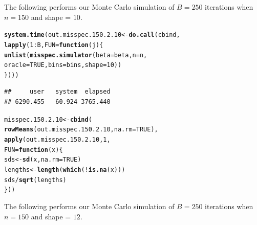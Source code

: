 \documentclass[11pt]{article}\usepackage[]{graphicx}\usepackage[]{color}
\makeatletter
\newcommand{\hlnum}[1]{\textcolor[rgb]{0.686,0.059,0.569}{#1}}%
\newcommand{\hlopt}[1]{\textcolor[rgb]{0,0,0}{#1}}%
\newcommand{\hlstd}[1]{\textcolor[rgb]{0.345,0.345,0.345}{#1}}%
\newcommand{\hlkwa}[1]{\textcolor[rgb]{0.161,0.373,0.58}{\textbf{#1}}}%
\newcommand{\hlkwb}[1]{\textcolor[rgb]{0.69,0.353,0.396}{#1}}%
\newcommand{\hlkwc}[1]{\textcolor[rgb]{0.333,0.667,0.333}{#1}}%
\newcommand{\hlkwd}[1]{\textcolor[rgb]{0.737,0.353,0.396}{\textbf{#1}}}%
\newenvironment{kframe}{%
 \def\at@end@of@kframe{}%
 \ifinner\ifhmode%
  \def\at@end@of@kframe{\end{minipage}}%
  \begin{minipage}{\columnwidth}%
 \fi\fi%
 \def\FrameCommand##1{\hskip\@totalleftmargin \hskip-\fboxsep
 \colorbox{shadecolor}{##1}\hskip-\fboxsep
     \hskip-\linewidth \hskip-\@totalleftmargin \hskip\columnwidth}%
 \MakeFramed {\advance\hsize-\width
   \@totalleftmargin\z@ \linewidth\hsize
   \@setminipage}}%
 {\par\unskip\endMakeFramed%
 \at@end@of@kframe}
\newenvironment{knitrout}{}{} %
\makeatother
\begin{document}
The following performs our Monte Carlo simulation of $B = 250$ iterations 
when $n = 150$ and shape = $10$.

\begin{knitrout}
\color{fgcolor}\begin{kframe}
\begin{alltt}
\hlkwd{system.time}\hlstd{(out.misspec.150.2.10} \hlkwb{<-} \hlkwd{do.call}\hlstd{(cbind,}
  \hlkwd{lapply}\hlstd{(}\hlnum{1}\hlopt{:}\hlstd{B,} \hlkwc{FUN} \hlstd{=} \hlkwa{function}\hlstd{(}\hlkwc{j}\hlstd{)\{}
    \hlkwd{unlist}\hlstd{(}\hlkwd{misspec.simulator}\hlstd{(}\hlkwc{beta} \hlstd{= beta,} \hlkwc{n} \hlstd{= n,}
      \hlkwc{oracle} \hlstd{=} \hlnum{TRUE}\hlstd{,} \hlkwc{bins} \hlstd{= bins,} \hlkwc{shape} \hlstd{=} \hlnum{10}\hlstd{))}
\hlstd{\})))}
\end{alltt}
\begin{verbatim}
##     user   system  elapsed 
## 6290.455   60.924 3765.440
\end{verbatim}
\end{kframe}
\end{knitrout}

\begin{knitrout}
\color{fgcolor}\begin{kframe}
\begin{alltt}
\hlstd{misspec.150.2.10} \hlkwb{<-} \hlkwd{cbind}\hlstd{(}
  \hlkwd{rowMeans}\hlstd{(out.misspec.150.2.10,} \hlkwc{na.rm} \hlstd{=} \hlnum{TRUE}\hlstd{),}
  \hlkwd{apply}\hlstd{(out.misspec.150.2.10,} \hlnum{1}\hlstd{,}
  \hlkwc{FUN} \hlstd{=} \hlkwa{function}\hlstd{(}\hlkwc{x}\hlstd{)\{}
    \hlstd{sds} \hlkwb{<-} \hlkwd{sd}\hlstd{(x,} \hlkwc{na.rm} \hlstd{=} \hlnum{TRUE}\hlstd{)}
    \hlstd{lengths} \hlkwb{<-} \hlkwd{length}\hlstd{(}\hlkwd{which}\hlstd{(}\hlopt{!}\hlkwd{is.na}\hlstd{(x)))}
    \hlstd{sds} \hlopt{/} \hlkwd{sqrt}\hlstd{(lengths)}
  \hlstd{\}))}
\end{alltt}
\end{kframe}
\end{knitrout}

The following performs our Monte Carlo simulation of $B = 250$ iterations 
when $n = 150$ and shape = $12$.
\end{document}
